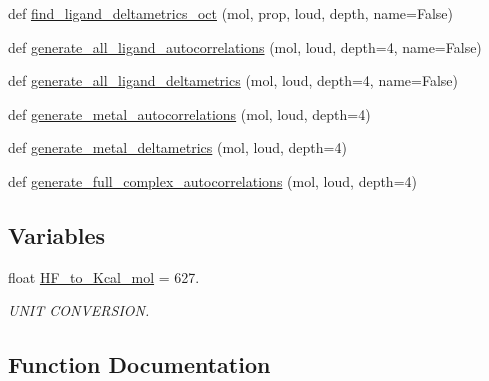 \begin{DoxyCompactItemize}
def \hyperlink{namespacemolSimplify_1_1Informatics_1_1autocorrelation_a6552646bebf9c1b28cd7953ed797aff9}{find\+\_\+ligand\+\_\+deltametrics\+\_\+oct} (mol, prop, loud, depth, name=False)
\item 
def \hyperlink{namespacemolSimplify_1_1Informatics_1_1autocorrelation_adcf9bd154c0c7b65097d1554b133dd02}{generate\+\_\+all\+\_\+ligand\+\_\+autocorrelations} (mol, loud, depth=4, name=False)
\item 
def \hyperlink{namespacemolSimplify_1_1Informatics_1_1autocorrelation_aa9672a057f5e2e4c829f5a8ae2bfea0f}{generate\+\_\+all\+\_\+ligand\+\_\+deltametrics} (mol, loud, depth=4, name=False)
\item 
def \hyperlink{namespacemolSimplify_1_1Informatics_1_1autocorrelation_ab418c8b372c58a217b07c166c075ef62}{generate\+\_\+metal\+\_\+autocorrelations} (mol, loud, depth=4)
\item 
def \hyperlink{namespacemolSimplify_1_1Informatics_1_1autocorrelation_a599db92eff56d53e6dc5c93d7b3e4292}{generate\+\_\+metal\+\_\+deltametrics} (mol, loud, depth=4)
\item 
def \hyperlink{namespacemolSimplify_1_1Informatics_1_1autocorrelation_ad23a2fac21b385283c416c8b9f0a6490}{generate\+\_\+full\+\_\+complex\+\_\+autocorrelations} (mol, loud, depth=4)
\end{DoxyCompactItemize}
\subsection*{Variables}
\begin{DoxyCompactItemize}
\item 
float \hyperlink{namespacemolSimplify_1_1Informatics_1_1autocorrelation_a32db0031c3a3b29b591751ef7f63a7bf}{H\+F\+\_\+to\+\_\+\+Kcal\+\_\+mol} = 627.
\begin{DoxyCompactList}\small\item\em U\+N\+IT C\+O\+N\+V\+E\+R\+S\+I\+ON. \end{DoxyCompactList}\end{DoxyCompactItemize}


\subsection{Function Documentation}
\mbox{\label{namespacemolSimplify_1_1Informatics_1_1autocorrelation_a5ea5cd28c3e45f0b72144b31e0e2a4bd}} 
